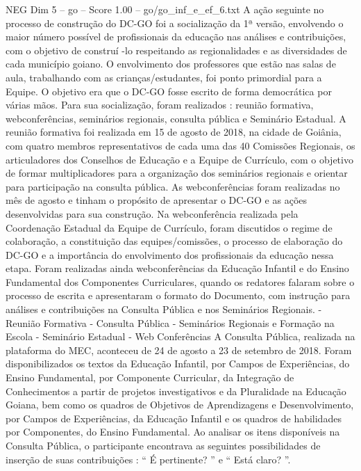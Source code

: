 \begin{textsample}{NEG Dim 5 – go – Score 1.00 – go/go\_inf\_e\_ef\_6.txt}  \label{ex:f5_neg_275}
A ação seguinte no processo de construção do DC-GO foi a socialização da 1ª versão, envolvendo o maior número possível de profissionais da educação nas análises e contribuições, com o objetivo de construí -lo respeitando as regionalidades e as diversidades de cada município goiano.
O envolvimento dos professores que estão nas salas de aula, trabalhando com as crianças/estudantes, foi ponto primordial para a Equipe.
O objetivo era que o DC-GO fosse escrito de forma democrática por várias mãos.
Para sua socialização, foram realizados : reunião formativa, webconferências, seminários regionais, consulta pública e Seminário Estadual.
A reunião formativa foi realizada em 15 de agosto de 2018, na cidade de Goiânia, com quatro membros representativos de cada uma das 40 Comissões Regionais, os articuladores dos Conselhos de Educação e a Equipe de Currículo, com o objetivo de formar multiplicadores para a organização dos seminários regionais e orientar para participação na consulta pública.
As webconferências foram realizadas no mês de agosto e tinham o propósito de apresentar o DC-GO e as ações desenvolvidas para sua construção.
Na webconferência realizada pela Coordenação Estadual da Equipe de Currículo, foram discutidos o regime de colaboração, a constituição das equipes/comissões, o processo de elaboração do DC-GO e a importância do envolvimento dos profissionais da educação nessa etapa.
Foram realizadas ainda webconferências da Educação Infantil e do Ensino Fundamental dos Componentes Curriculares, quando os redatores falaram sobre o processo de escrita e apresentaram o formato do Documento, com instrução para análises e contribuições na Consulta Pública e nos Seminários Regionais. - Reunião Formativa - Consulta Pública - Seminários Regionais e Formação na Escola - Seminário Estadual - Web Conferências A Consulta Pública, realizada na plataforma do MEC, aconteceu de 24 de agosto a 23 de setembro de 2018.
Foram disponibilizados os textos da Educação Infantil, por Campos de Experiências, do Ensino Fundamental, por Componente Curricular, da Integração de Conhecimentos a partir de projetos investigativos e da Pluralidade na Educação Goiana, bem como os quadros de Objetivos de Aprendizagens e Desenvolvimento, por Campos de Experiências, da Educação Infantil e os quadros de habilidades por Componentes, do Ensino Fundamental.
Ao analisar os itens disponíveis na Consulta Pública, o participante encontrava as seguintes possibilidades de inserção de suas contribuições : “ É pertinente? ” e “ Está claro? ”.

\end{textsample}
